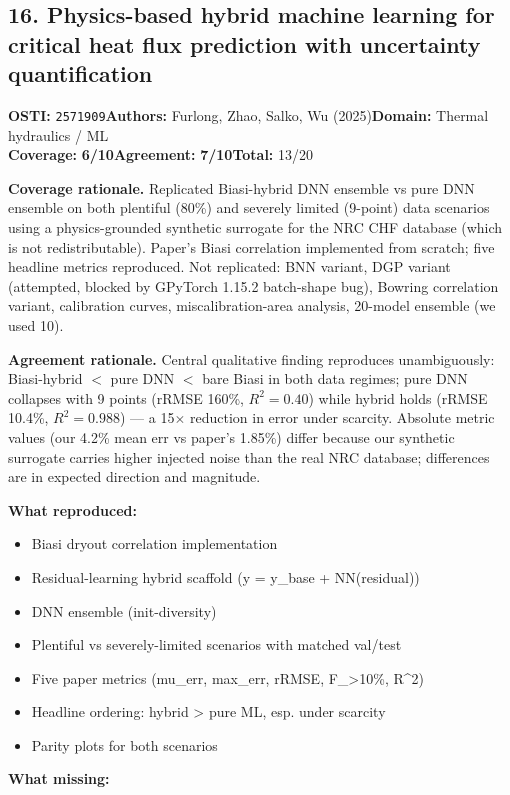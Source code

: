 \documentclass[11pt]{article}
\newcommand{\scorebadge}[2]{\textbf{#1:} \textbf{#2/10}}
\begin{document}
\subsection{16. Physics-based hybrid machine learning for critical heat flux prediction with uncertainty quantification}
\textbf{OSTI:} \texttt{2571909}\quad\textbf{Authors:} Furlong, Zhao, Salko, Wu (2025)\quad\textbf{Domain:} Thermal hydraulics / ML\\
\scorebadge{Coverage}{6}\quad\scorebadge{Agreement}{7}\quad\textbf{Total:} 13/20\par\smallskip
\noindent\textbf{Coverage rationale.} Replicated Biasi-hybrid DNN ensemble vs pure DNN ensemble on both plentiful (80\%) and severely limited (9-point) data scenarios using a physics-grounded synthetic surrogate for the NRC CHF database (which is not redistributable). Paper's Biasi correlation implemented from scratch; five headline metrics reproduced. Not replicated: BNN variant, DGP variant (attempted, blocked by GPyTorch 1.15.2 batch-shape bug), Bowring correlation variant, calibration curves, miscalibration-area analysis, 20-model ensemble (we used 10).\par
\noindent\textbf{Agreement rationale.} Central qualitative finding reproduces unambiguously: Biasi-hybrid $<$ pure DNN $<$ bare Biasi in both data regimes; pure DNN collapses with 9 points (rRMSE 160\%, $R^2=0.40$) while hybrid holds (rRMSE 10.4\%, $R^2=0.988$) --- a 15$\times$ reduction in error under scarcity. Absolute metric values (our 4.2\% mean err vs paper's 1.85\%) differ because our synthetic surrogate carries higher injected noise than the real NRC database; differences are in expected direction and magnitude.\par\smallskip
\noindent\textbf{What reproduced:}
\begin{itemize}[leftmargin=1.4em,itemsep=0.2em,topsep=0.2em]
\item Biasi dryout correlation implementation
\item Residual-learning hybrid scaffold (y = y\_base + NN(residual))
\item DNN ensemble (init-diversity)
\item Plentiful vs severely-limited scenarios with matched val/test
\item Five paper metrics (mu\_err, max\_err, rRMSE, F\_\textgreater{}10\%, R\textasciicircum{}2)
\item Headline ordering: hybrid \textgreater{} pure ML, esp. under scarcity
\item Parity plots for both scenarios
\end{itemize}\noindent\textbf{What missing:}
\end{document}

